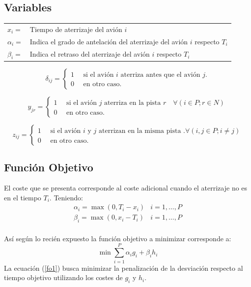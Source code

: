 \documentclass[letter, 10pt]{article}
\begin{document}
\subsection{Variables}

\begin{table}[h]
\begin{tabular}{ll}
$x_i = $  & Tiempo de aterrizaje del avión $i$\\
$\alpha_i = $ & Indica el grado de antelación del aterrizaje del avión $i$ respecto $T_i$\\
$\beta_i = $ & Indica el retraso del aterrizaje del avión $i$ respecto $T_i$
\end{tabular}
\end{table}

$$
\delta_{i j}=\left\{\begin{array}{c}1 \quad \text { si el avión } i \text{ aterriza antes que el avión } j. \\ 0 \quad \text { en otro caso. }\end{array}\right.
$$

$$
{y}_{jr}=\left\{\begin{array}{c}1 \quad \text { si el avión } j \text{ aterriza en la pista } r \quad \forall (i \in P; r \in N) \\ 0 \quad \text { en otro caso. }\end{array}\right.
$$

$$
{z}_{ij}=\left\{\begin{array}{c}1 \quad \text { si el avión } i \text{ y } j \text{ aterrizan en la misma pista }. \forall(i,j \in P; i \neq j) \\ 0 \quad \text { en otro caso. }\end{array}\right.
$$
\subsection{Función Objetivo}
El coste que se presenta corresponde al coste adicional cuando el aterrizaje no es en el tiempo $T_i$. Teniendo:
$$
\begin{array}{ll}\alpha_{i}=\max \left(0, T_{i}-x_{i}\right) & i=1, \ldots, P \\ \beta_{i}=\max \left(0, x_{i}-T_{i}\right) & i=1, \ldots, P\end{array}
$$
\\
Así según lo recién expuesto la función objetivo a minimizar corresponde a:\\
\begin{equation}
    \min \sum_{i=1}^{P} \alpha_i g_i + \beta_i h_i
    \label{fo1}
\end{equation}
La  ecuación  (\ref{fo1}) busca minimizar la penalización de la desviación respecto al tiempo objetivo utilizando los costes de $g_i$ y $h_i$.
\end{document}
